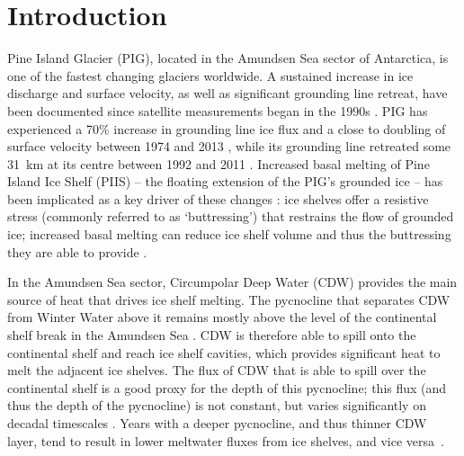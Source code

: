 \documentclass[draft]{agujournal2019}
\begin{document}
%
%
\section{Introduction}\label{S:Introduction}
Pine Island Glacier (PIG), located in the Amundsen Sea sector of Antarctica, is one of the fastest changing glaciers worldwide. A sustained increase in ice discharge and surface velocity, as well as significant grounding line retreat, have been documented since satellite measurements began in the 1990s \cite{Rignot2002AnnGlac, Rignot2008GRL, Rignot2011Science, Mouginot2014GRL, Gardner2018Cryo}. PIG has experienced a 70\% increase in grounding line ice flux and a close to doubling of surface velocity between 1974 and 2013 \cite{Mouginot2014GRL}, while its grounding line retreated some 31~km at its centre between 1992 and 2011 \cite{Rignot2014GRL}. Increased basal melting of Pine Island Ice Shelf (PIIS) -- the floating extension of the PIG's grounded ice -- has been implicated as a key driver of these changes \cite{Shepherd2004GRL, Pritchard2012Nature, Rignot2019PNAS}: ice shelves offer a resistive stress (commonly referred to as `buttressing') that restrains the flow of grounded ice; increased basal melting can reduce ice shelf volume and thus the buttressing they are able to provide \cite{Gudmundsson2013Cryo, Reese2018NatureClimCh, Gudmundsson2019GRL,Gagliardini2010GRL,Goldberg2019GRL, DeRydt2021Cryosphere}.

In the Amundsen Sea sector, Circumpolar Deep Water (CDW) provides the main source of heat that drives ice shelf melting. The pycnocline that separates CDW from Winter Water above it remains mostly above the level of the continental shelf break in the Amundsen Sea \cite{Jacobs2015Oceanography, Heywood2016Oceanography}. CDW is therefore able to spill onto the continental shelf and reach ice shelf cavities, which provides significant heat to melt the adjacent ice shelves. The flux of CDW that is able to spill over the continental shelf is a good proxy for the depth of this pycnocline; this flux (and thus the depth of the pycnocline) is not constant, but varies significantly on decadal timescales \cite{Jenkins2018NatureGeo}. Years with a deeper pycnocline, and thus thinner CDW layer, tend to result in lower meltwater fluxes from ice shelves, and vice versa~\cite{Jacobs2011NatureGeosci,Dutrieux2014Science}.
\end{document}
